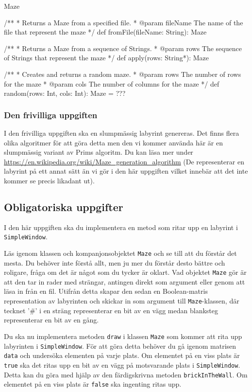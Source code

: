 \begin{ScalaSpec}{Maze}
{  /**
   *  Returns a Maze from a specified file.
   *  @param fileName	   The name of the file that represent the maze
   */
  def fromFile(fileName: String): Maze

  /**
   *  Returns a Maze from a sequence of Strings.
   *  @param rows	The sequence of Strings that represent the maze
   */
  def apply(rows: String*): Maze

  /**
   *  Creates and returns a random maze.
   *  @param rows		The number of rows for the maze
   *  @param cols		The number of columns for the maze
   */
  def random(rows: Int, cols: Int): Maze = ???

}

\end{ScalaSpec}

\subsubsection{Den frivilliga uppgiften}

I den frivilliga uppgiften ska en slumpmässig labyrint genereras. Det finns flera olika algoritmer för att göra detta men den vi kommer använda här är en slumpmässig variant av Prims algoritm. Du kan läsa mer under \url{https://en.wikipedia.org/wiki/Maze\_generation\_algorithm} (De representerar en labyrint på ett annat sätt än vi gör i den här uppgiften vilket innebär att det inte kommer se precis likadant ut).


\subsection{Obligatoriska uppgifter}

\Task I den här uppgiften ska du implementera en metod som ritar upp en labyrint i \texttt{SimpleWindow}.

\Subtask Läs igenom klassen och kompanjonsobjektet \texttt{Maze} och se till att du förstår det mesta. Du behöver inte förstå allt, men ju mer du förstår desto bättre och roligare, fråga om det är något som du tycker är oklart. Vad objektet \texttt{Maze} gör är att den tar in rader med strängar, antingen direkt som argument eller genom att läsa in från en fil. Utifrån detta skapar den sedan en Boolean-matris representation av labyrinten och skickar in som argument till \texttt{Maze}-klassen, där tecknet '\#' i en sträng representerar en bit av en vägg medan blanksteg representerar en bit av en gång.

\Subtask Du ska nu implementera metoden \texttt{draw} i klassen \texttt{Maze} som kommer att rita upp labyrinten i \texttt{SimpleWindow}. För att göra detta behöver du gå igenom matrisen \texttt{data} och undersöka elementen på varje plats. Om elementet på en viss plats är \texttt{true} ska det ritas upp en bit av en vägg på motsvarande plats i \texttt{SimpleWindow}. Detta kan du göra med hjälp av den färdigskrivna metoden \texttt{brickInTheWall}. Om elementet på en viss plats är \texttt{false} ska ingenting ritas upp.


